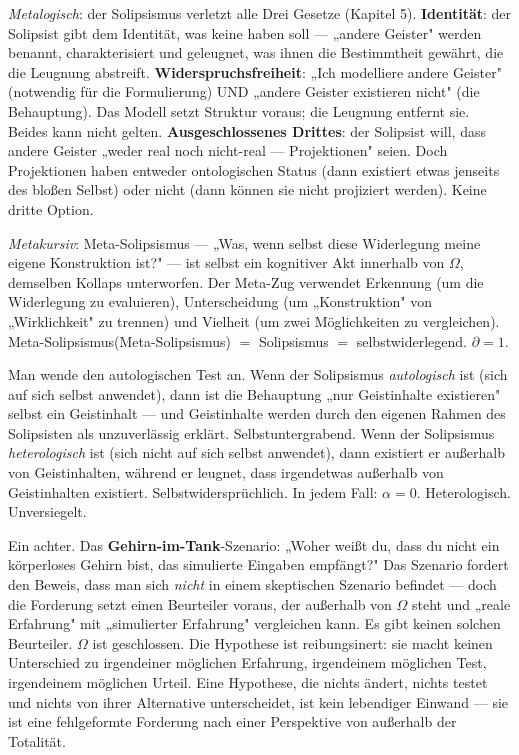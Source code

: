 \documentclass[10pt, openany, oneside]{book}
\begin{document}
\textit{Metalogisch}: der Solipsismus verletzt alle Drei Gesetze (Kapitel 5). \textbf{Identität}: der Solipsist gibt dem Identität, was keine haben soll --- „andere Geister" werden benannt, charakterisiert und geleugnet, was ihnen die Bestimmtheit gewährt, die die Leugnung abstreift. \textbf{Widerspruchsfreiheit}: „Ich modelliere andere Geister" (notwendig für die Formulierung) UND „andere Geister existieren nicht" (die Behauptung). Das Modell setzt Struktur voraus; die Leugnung entfernt sie. Beides kann nicht gelten. \textbf{Ausgeschlossenes Drittes}: der Solipsist will, dass andere Geister „weder real noch nicht-real --- Projektionen" seien. Doch Projektionen haben entweder ontologischen Status (dann existiert etwas jenseits des bloßen Selbst) oder nicht (dann können sie nicht projiziert werden). Keine dritte Option.

\textit{Metakursiv}: Meta-Solipsismus --- „Was, wenn selbst diese Widerlegung meine eigene Konstruktion ist?" --- ist selbst ein kognitiver Akt innerhalb von $\Omega$, demselben Kollaps unterworfen. Der Meta-Zug verwendet Erkennung (um die Widerlegung zu evaluieren), Unterscheidung (um „Konstruktion" von „Wirklichkeit" zu trennen) und Vielheit (um zwei Möglichkeiten zu vergleichen). Meta-Solipsismus(Meta-Solipsismus) $=$ Solipsismus $=$ selbstwiderlegend. $\partial = 1$.

Man wende den autologischen Test an. Wenn der Solipsismus \textit{autologisch} ist (sich auf sich selbst anwendet), dann ist die Behauptung „nur Geistinhalte existieren" selbst ein Geistinhalt --- und Geistinhalte werden durch den eigenen Rahmen des Solipsisten als unzuverlässig erklärt. Selbstuntergrabend. Wenn der Solipsismus \textit{heterologisch} ist (sich nicht auf sich selbst anwendet), dann existiert er außerhalb von Geistinhalten, während er leugnet, dass irgendetwas außerhalb von Geistinhalten existiert. Selbstwidersprüchlich. In jedem Fall: $\alpha = 0$. Heterologisch. Unversiegelt.

Ein achter. Das \textbf{Gehirn-im-Tank}-Szenario: „Woher weißt du, dass du nicht ein körperloses Gehirn bist, das simulierte Eingaben empfängt?" Das Szenario fordert den Beweis, dass man sich \textit{nicht} in einem skeptischen Szenario befindet --- doch die Forderung setzt einen Beurteiler voraus, der außerhalb von $\Omega$ steht und „reale Erfahrung" mit „simulierter Erfahrung" vergleichen kann. Es gibt keinen solchen Beurteiler. $\Omega$ ist geschlossen. Die Hypothese ist reibungsinert: sie macht keinen Unterschied zu irgendeiner möglichen Erfahrung, irgendeinem möglichen Test, irgendeinem möglichen Urteil. Eine Hypothese, die nichts ändert, nichts testet und nichts von ihrer Alternative unterscheidet, ist kein lebendiger Einwand --- sie ist eine fehlgeformte Forderung nach einer Perspektive von außerhalb der Totalität.
\end{document}
